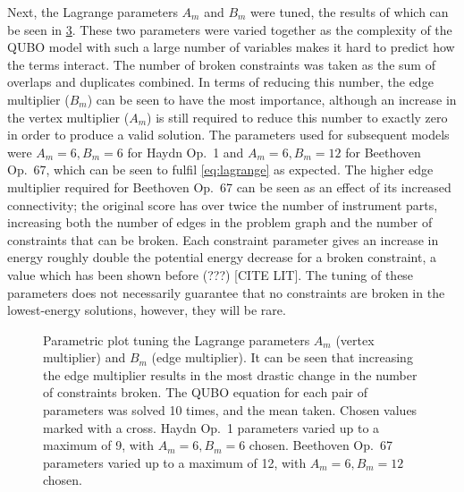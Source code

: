 \documentclass[12pt]{article}
\theoremstyle{definition}
\begin{document}
Next, the Lagrange parameters $A_m$ and $B_m$ were tuned, the results of which can be seen in \cref{fig:lagrange}. These two parameters were varied together as the complexity of the QUBO model with such a large number of variables makes it hard to predict how the terms interact. The number of broken constraints was taken as the sum of overlaps and duplicates combined. In terms of reducing this number, the edge multiplier ($B_m$) can be seen to have the most importance, although an increase in the vertex multiplier ($A_m$) is still required to reduce this number to exactly zero in order to produce a valid solution. The parameters used for subsequent models were $A_m=6,B_m=6$ for Haydn Op.\ 1 and $A_m=6,B_m=12$ for Beethoven Op.\ 67, which can be seen to fulfil \cref{eq:lagrange} as expected. The higher edge multiplier required for Beethoven Op.\ 67 can be seen as an effect of its increased connectivity; the original score has over twice the number of instrument parts, increasing both the number of edges in the problem graph and the number of constraints that can be broken. Each constraint parameter gives an increase in energy roughly double the potential energy decrease for a broken constraint, a value which has been shown before (???) [CITE LIT]. The tuning of these parameters does not necessarily guarantee that no constraints are broken in the lowest-energy solutions, however, they will be rare.

\begin{figure}[ht]
    \centering\tiny
    \begin{subfigure}{.5\textwidth}
        
        \caption{}
        \label{fig:haydn-lagrange}
    \end{subfigure}\hfill
    \begin{subfigure}{.5\textwidth}
        
        \caption{}
        \label{fig:beethoven-lagrange}
    \end{subfigure}
    \caption{Parametric plot tuning the Lagrange parameters $A_m$ (vertex multiplier) and $B_m$ (edge multiplier). It can be seen that increasing the edge multiplier results in the most drastic change in the number of constraints broken. The QUBO equation for each pair of parameters was solved 10 times, and the mean taken. Chosen values marked with a cross. \textbf{} Haydn Op.\ 1 parameters varied up to a maximum of 9, with $A_m=6,B_m=6$ chosen. \textbf{} Beethoven Op.\ 67 parameters varied up to a maximum of 12, with $A_m=6,B_m=12$ chosen.}
    \label{fig:lagrange}
\end{figure}
\end{document}

